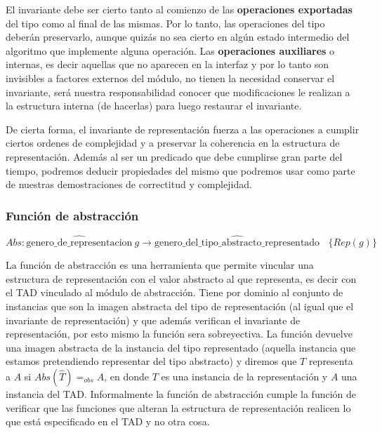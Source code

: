 El invariante debe ser cierto tanto al comienzo de las \textbf{operaciones exportadas} del tipo como al final de las mismas. Por lo tanto, las operaciones del tipo deber\'an preservarlo, aunque quiz\'as no sea cierto en alg\'un estado intermedio del algoritmo que implemente alguna operaci\'on. Las \textbf{operaciones auxiliares} o internas, es decir aquellas que no aparecen en la interfaz y por lo tanto son invisibles a factores externos del m\'odulo, no tienen la necesidad conservar el invariante, ser\'a nuestra responsabilidad conocer que modificaciones le realizan a la estructura interna (de hacerlas) para luego restaurar el invariante.

De cierta forma, el invariante de representaci\'on fuerza a las operaciones a cumplir ciertos ordenes de complejidad y a preservar la coherencia en la estructura de representaci\'on. Adem\'as al ser un predicado que debe cumplirse gran parte del tiempo, podremos deducir propiedades del mismo que podremos usar como parte de nuestras demostraciones de correctitud y complejidad.

\subsubsection{Funci\'on de abstracci\'on}

\begin{equation*}
 Abs: \widehat{\text{genero\_de\_representacion}}\ g \rightarrow \widehat{\text{genero\_del\_tipo\_abstracto\_representado}} \ \ \ \ \{Rep(g)\}
\end{equation*}

La funci\'on de abstracci\'on es una herramienta que permite vincular una estructura de representaci\'on con el valor abstracto al que representa, es decir con el TAD vinculado al m\'odulo de abstracci\'on. Tiene por dominio al conjunto de instancias que son la imagen abstracta del tipo de representaci\'on (al igual que el invariante de representaci\'on) y que adem\'as verifican el invariante de representaci\'on, por esto mismo la funci\'on sera sobreyectiva. La funci\'on devuelve una imagen abstracta de la instancia del tipo representado (aquella instancia que estamos pretendiendo representar del tipo abstracto) y diremos que $T$ representa a $A$ si $Abs(\widehat{T})=_{obs} A$, en donde $T$ es una instancia de la representaci\'on y $A$ una instancia del TAD. Informalmente la funci\'on de abstracci\'on cumple la funci\'on de verificar que las funciones que alteran la estructura de representaci\'on realicen lo que est\'a especificado en el TAD y no otra cosa.

